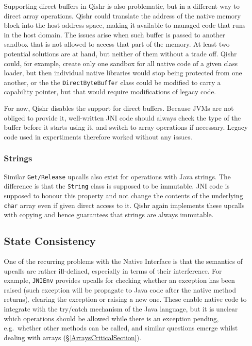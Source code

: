 \documentclass[a4paper,12pt,twoside,openright]{report}
\newcommand{\class}[1]{\texttt{#1}}
\begin{document}
Supporting direct buffers in Qishr is also problematic, but in a different way to direct array operations. Qishr could translate the address of the native memory block into the host address space, making it available to managed code that runs in the host domain. The issues arise when such buffer is passed to another sandbox that is not allowed to access that part of the memory. At least two potential solutions are at hand, but neither of them without a trade off. Qishr could, for example, create only one sandbox for all native code of a given class loader, but then individual native libraries would stop being protected from one another, or the the \class{DirectByteBuffer} class could be modified to carry a capability pointer, but that would require modifications of legacy code.

For now, Qishr disables the support for direct buffers. Because JVMs are not obliged to provide it, well-written JNI code should always check the type of the buffer before it starts using it, and switch to array operations if necessary. Legacy code used in expertiments therefore worked without any issues.

\subsubsection{Strings}

Similar \texttt{Get/Release} upcalls also exist for operations with Java strings. The difference is that the \class{String} class is supposed to be immutable. JNI code is supposed to honour this property and not change the contents of the underlying \class{char} array even if given direct access to it. Qishr again implements these upcalls with copying and hence guarantees that strings are always immutable.

\subsection{State Consistency}

One of the recurring problems with the Native Interface is that the semantics of upcalls are rather ill-defined, especially in terms of their interference. For example, \texttt{JNIEnv} provides upcalls for checking whether an exception has been raised (such exception will be propagate to Java code after the native method returns), clearing the exception or raising a new one. These enable native code to integrate with the try/catch mechanism of the Java language, but it is unclear which operations should be allowed while there is an exception pending, e.g.\ whether other methods can be called, and similar questions emerge whilst dealing with arrays (\S\ref{ArraysCriticalSection}). 
\end{document}
